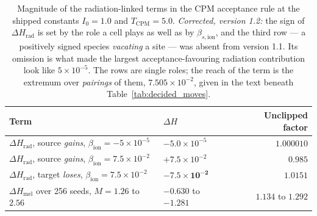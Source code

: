 \documentclass[11pt]{article}
\begin{document}
\begin{table}[h!]
\centering
\small
\caption{Magnitude of the radiation-linked terms in the CPM acceptance rule at the shipped
constants $I_0=1.0$ and $T_{\mathrm{CPM}}=5.0$. \emph{Corrected, version 1.2:} the sign of
$\Delta H_{\mathrm{rad}}$ is set by the role a cell plays as well as by $\beta_{s,\mathrm{ion}}$,
and the third row --- a positively signed species \emph{vacating} a site --- was absent from
version 1.1. Its omission is what made the largest acceptance-favouring radiation contribution
look like $5\times10^{-5}$. The rows are single roles; the reach of the term is the extremum over
\emph{pairings} of them, $7.505\times10^{-2}$, given in the text beneath Table~\ref{tab:decided_moves}.}
\label{tab:term_magnitudes}
\begin{tabular}{@{}llr@{}}
\toprule
\textbf{Term} & $\Delta H$ & \textbf{Unclipped factor} \\
\midrule
$\Delta H_{\mathrm{rad}}$, source \emph{gains}, $\beta_{\mathrm{ion}}=-5\times10^{-5}$ & $-5.0\times10^{-5}$ & $1.000010$ \\
$\Delta H_{\mathrm{rad}}$, source \emph{gains}, $\beta_{\mathrm{ion}}=7.5\times10^{-2}$ & $+7.5\times10^{-2}$ & $0.985$ \\
$\Delta H_{\mathrm{rad}}$, target \emph{loses}, $\beta_{\mathrm{ion}}=7.5\times10^{-2}$ & $\mathbf{-7.5\times10^{-2}}$ & $\mathbf{1.0151}$ \\
$\Delta H_{\mathrm{mel}}$ over 256 seeds, $M=1.26$ to $2.56$ & $-0.630$ to $-1.281$ & $\mathbf{1.134}$ to $\mathbf{1.292}$ \\
\bottomrule
\end{tabular}
\end{table}
\end{document}
